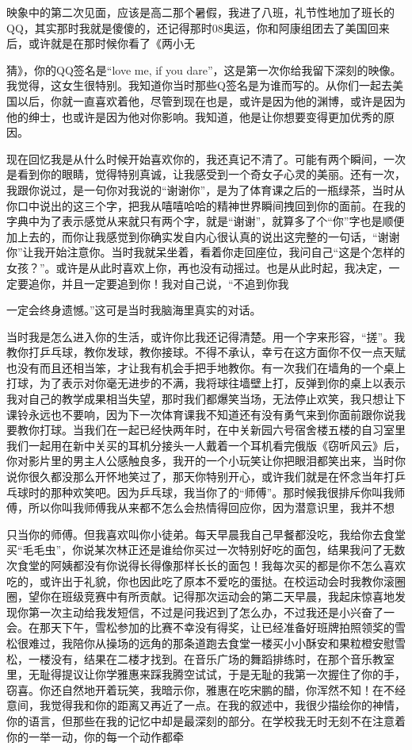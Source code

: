 \documentclass{article}
\begin{document}
映象中的第二次见面，应该是高二那个暑假，我进了八班，礼节性地加了班长的QQ，其实那时我就是傻傻的，还记得那时08奥运，你和阿康组团去了美国回来后，或许就是在那时候你看了《两小无

\newpage 

猜》，你的QQ签名是“love me, if you dare”，这是第一次你给我留下深刻的映像。我觉得，这女生很特别。我知道你当时那些Q签名是为谁而写的。从你们一起去美国以后，你就一直喜欢着他，尽管到现在也是，或许是因为他的渊博，或许是因为他的绅士，也或许是因为他对你影响。我知道，他是让你想要变得更加优秀的原因。

现在回忆我是从什么时候开始喜欢你的，我还真记不清了。可能有两个瞬间，一次是看到你的眼睛，觉得特别真诚，让我感受到一个奇女子心灵的美丽。还有一次，我跟你说过，是一句你对我说的“谢谢你”，是为了体育课之后的一瓶绿茶，当时从你口中说出的这三个字，把我从嘻嘻哈哈的精神世界瞬间拽回到你的面前。在我的字典中为了表示感觉从来就只有两个字，就是“谢谢”，就算多了个“你”字也是顺便加上去的，而你让我感觉到你确实发自内心很认真的说出这完整的一句话，“谢谢你”让我开始注意你。当时我就呆坐着，看着你走回座位，我问自己“这是个怎样的女孩？”。或许是从此时喜欢上你，再也没有动摇过。也是从此时起，我决定，一定要追你，并且一定要追到你！我对自己说，“不追到你我

\newpage 

一定会终身遗憾。”这可是当时我脑海里真实的对话。

当时我是怎么进入你的生活，或许你比我还记得清楚。用一个字来形容，“搓”。我教你打乒乓球，教你发球，教你接球。不得不承认，幸亏在这方面你不仅一点天赋也没有而且还相当笨，才让我有机会手把手地教你。有一次我们在墙角的一个桌上打球，为了表示对你毫无进步的不满，我将球往墙壁上打，反弹到你的桌上以表示我对自己的教学成果相当失望，那时我们都爆笑当场，无法停止欢笑，我只想让下课铃永远也不要响，因为下一次体育课我不知道还有没有勇气来到你面前跟你说我要教你打球。当我们在一起已经快两年时，在中关新园六号宿舍楼五楼的自习室里我们一起用在新中关买的耳机分接头一人戴着一个耳机看完俄版《窃听风云》后，你对影片里的男主人公感触良多，我开的一个小玩笑让你把眼泪都笑出来，当时你说你很久都没那么开怀地笑过了，那天你特别开心，或许我们就是在怀念当年打乒乓球时的那种欢笑吧。因为乒乓球，我当你了的“师傅”。那时候我很排斥你叫我师傅，所以你叫我师傅我从来都不怎么会热情得回应你，因为潜意识里，我并不想

\newpage 

只当你的师傅。但我喜欢叫你小徒弟。每天早晨我自己早餐都没吃，我给你去食堂买“毛毛虫”，你说某次林正还是谁给你买过一次特别好吃的面包，结果我问了无数次食堂的阿姨都没有你说得长得像那样长长的面包！我每次买的都是你不怎么喜欢吃的，或许出于礼貌，你也因此吃了原本不爱吃的蛋挞。在校运动会时我教你滚圈圈，望你在班级竞赛中有所贡献。记得那次运动会的第二天早晨，我起床惊喜地发现你第一次主动给我发短信，不过是问我迟到了怎么办，不过我还是小兴奋了一会。在那天下午，雪松参加的比赛不幸没有得奖，让已经准备好班牌拍照领奖的雪松很难过，我陪你从操场的远角的那条道跑去食堂一楼买小小酥安和果粒橙安慰雪松，一楼没有，结果在二楼才找到。在音乐广场的舞蹈排练时，在那个音乐教室里，无耻得提议让你学雅惠来踩我腾空试试，于是无耻的我第一次握住了你的手，窃喜。你还自然地开着玩笑，我暗示你，雅惠在吃宋鹏的醋，你浑然不知！在不经意间，我觉得我和你的距离又再近了一点。在我的叙述中，我很少描绘你的神情，你的语言，但那些在我的记忆中却是最深刻的部分。在学校我无时无刻不在注意着你的一举一动，你的每一个动作都牵
\end{document}
